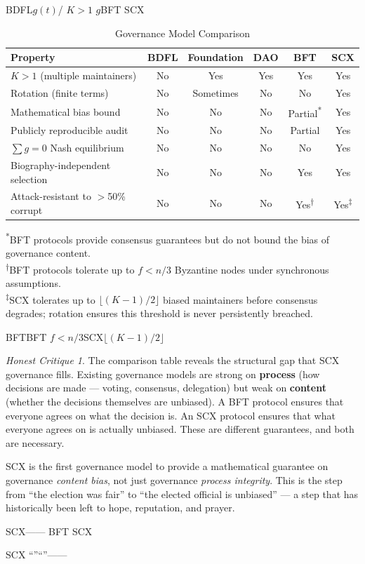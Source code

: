 \documentclass[12pt,a4paper]{article}
\theoremstyle{remark}
\newtheorem{honesthit}{Honest Critique}[section]
\newenvironment{hitbox}{%
  \begin{center}
  \color{red}
  \begin{minipage}{0.92\textwidth}
  \begin{honesthit}
}{%
  \end{honesthit}
  \end{minipage}
  \end{center}
}
\begin{document}
\noindent\textbf{}
BDFL$g(t)$/
$K>1$
$g$BFT
SCX

\begin{table}[H]
\centering
\caption{Governance Model Comparison}
\label{tab:comparison}
\small
\begin{tabular}{@{}lccccc@{}}
\toprule
\textbf{Property} & \textbf{BDFL} & \textbf{Foundation} & \textbf{DAO} & \textbf{BFT} & \textbf{SCX} \\
\midrule
$K > 1$ (multiple maintainers)     & No  & Yes & Yes & Yes & Yes \\
Rotation (finite terms)            & No  & Sometimes & No & No & Yes \\
Mathematical bias bound            & No  & No & No & Partial\textsuperscript{*} & Yes \\
Publicly reproducible audit        & No  & No & No & Partial & Yes \\
$\sum g = 0$ Nash equilibrium      & No  & No & No & No & Yes \\
Biography-independent selection    & No  & No & No & Yes & Yes \\
Attack-resistant to $>$50\% corrupt & No  & No & No & Yes\textsuperscript{†} & Yes\textsuperscript{‡} \\
\bottomrule
\end{tabular}

\vspace{4pt}
\footnotesize
\textsuperscript{*}BFT protocols provide consensus guarantees but do not bound the bias of governance content.\\
\textsuperscript{†}BFT protocols tolerate up to $f < n/3$ Byzantine nodes under synchronous assumptions.\\
\textsuperscript{‡}SCX tolerates up to $\lfloor (K-1)/2 \rfloor$ biased maintainers before consensus degrades;
     rotation ensures this threshold is never persistently breached.
\end{table}

\noindent\textbf{}
BFTBFT
$f < n/3$SCX$\lfloor (K-1)/2 \rfloor$


\begin{hitbox}
The comparison table reveals the structural gap that SCX governance fills.
Existing governance models are strong on \textbf{process} (how decisions are
made — voting, consensus, delegation) but weak on \textbf{content} (whether
the decisions themselves are unbiased). A BFT protocol ensures that everyone
agrees on what the decision is. An SCX protocol ensures that what everyone
agrees on is actually unbiased. These are different guarantees, and both are
necessary.

SCX is the first governance model to provide a mathematical guarantee on
governance \textit{content bias}, not just governance \textit{process integrity}.
This is the step from ``the election was fair'' to ``the elected official is
unbiased'' — a step that has historically been left to hope, reputation, and
prayer.

\begin{center}
\small\textbf{}
SCX——
BFT
SCX

SCX\textit{}\textit{}
“”“”——

\end{center}
\end{hitbox}
\end{document}
